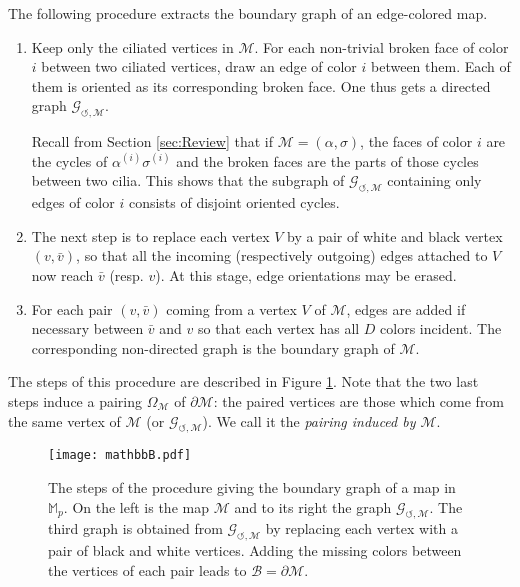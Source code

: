 \documentclass[aps,prd,10pt,notitlepage,nofootinbib,superscriptaddress,showkeys,showpacs]{revtex4-1}
\begin{document}
The following procedure extracts the boundary graph of an edge-colored map.
\begin{enumerate}
\item Keep only the ciliated vertices in ${\mathcal{M}}$. For each non-trivial broken face of color $i$ between two ciliated vertices, draw an edge of color $i$ between them. Each of them is oriented as its corresponding broken face. One thus gets a directed graph ${\mathcal{G}}_{\circlearrowleft, {\mathcal{M}}}$.

Recall from Section \ref{sec:Review} that if ${\mathcal{M}} = (\alpha, \sigma)$, the faces of color $i$ are the cycles of $\alpha^{(i)}\sigma^{(i)}$ and the broken faces are the parts of those cycles between two cilia. This shows that the subgraph of ${\mathcal{G}}_{\circlearrowleft, {\mathcal{M}}}$ containing only edges of color $i$ consists of disjoint oriented cycles.
\item The next step is to replace each vertex $V$ by a pair of white and black vertex $(v, \bar{v})$, so that all the incoming (respectively outgoing) edges attached to $V$ now reach $\bar{v}$ (resp. $v$). At this stage, edge orientations may be erased. 
\item For each pair $(v, \bar{v})$ coming from a vertex $V$ of ${\mathcal{M}}$, edges are added if necessary between $\bar{v}$ and $v$ so that each vertex has all $D$ colors incident. The corresponding non-directed graph is the boundary graph of ${\mathcal{M}}$. 
\end{enumerate}
The steps of this procedure are described in Figure \ref{fig:boundM}. Note that the two last steps induce a pairing $\Omega_{\mathcal{M}}$ of $\partial {\mathcal{M}}$: the paired vertices are those which come from the same vertex of ${\mathcal{M}}$ (or ${\mathcal{G}}_{\circlearrowleft, {\mathcal{M}}}$). We call it the \emph{pairing induced by ${\mathcal{M}}$}.
\begin{figure}
\texttt{[image: mathbbB.pdf]}
\caption{\label{fig:boundM} The steps of the procedure giving the boundary graph of a map in $\mathbb{M}_p$. On the left is the map ${\mathcal{M}}$ and to its right the graph ${\mathcal{G}}_{\circlearrowleft, {\mathcal{M}}}$. The third graph is obtained from ${\mathcal{G}}_{\circlearrowleft, {\mathcal{M}}}$ by replacing each vertex with a pair of black and white vertices. Adding the missing colors between the vertices of each pair leads to ${\mathcal{B}} = \partial {\mathcal{M}}$.}
\end{figure}
\end{document}
